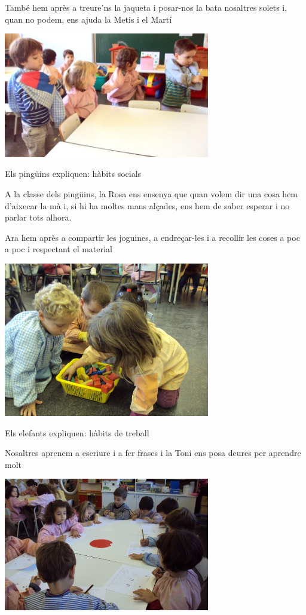 \begin{news}
També hem après a treure’ns la jaqueta i posar-nos la bata nosaltres solets i, quan no podem, ens ajuda la Metis i el Martí


\noindent\includegraphics[width=9cm,keepaspectratio]{parvulari/img/foto2b.jpg}



Els pingüins expliquen: hàbits socials

A la classe dels pingüins,  la Rosa ens ensenya que quan volem dir una cosa  hem d’aixecar la mà i,  si hi ha moltes mans alçades, ens hem de saber esperar i no parlar tots alhora.




Ara hem après a compartir les joguines,  a endreçar-les i a recollir les coses a poc a poc i respectant el material



\noindent\includegraphics[width=9cm,keepaspectratio]{parvulari/img/foto4.jpg}

Els elefants expliquen: hàbits de treball

Nosaltres aprenem a escriure i a fer frases i la Toni ens posa deures per aprendre molt

\noindent\includegraphics[width=9cm,keepaspectratio]{parvulari/img/foto5b.jpg}


\end{news}
